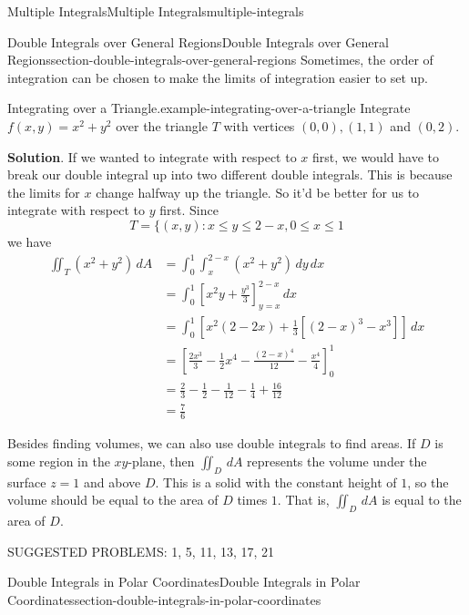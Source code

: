 \documentclass[oneside,10pt,]{book}
\numberwithin{equation}{section}
\begin{document}
\begin{chapterptx}{Multiple Integrals}{}{Multiple Integrals}{}{}{multiple-integrals}
\begin{sectionptx}{Double Integrals over General Regions}{}{Double Integrals over General Regions}{}{}{section-double-integrals-over-general-regions}
\hypertarget{p-1483}{}%
Sometimes, the order of integration can be chosen to make the limits of integration easier to set up.%
\begin{example}{Integrating over a Triangle.}{example-integrating-over-a-triangle}%
\hypertarget{p-1484}{}%
Integrate \(f(x,y) = x^{2} + y^{2}\) over the triangle \(T\) with vertices \((0,0), (1,1)\) and \((0,2)\).%
\par\smallskip%
\noindent\textbf{Solution}.\hypertarget{solution-243}{}\quad%
\hypertarget{p-1485}{}%
If we wanted to integrate with respect to \(x\) first, we would have to break our double integral up into two different double integrals. This is because the limits for \(x\) change halfway up the triangle. So it'd be better for us to integrate with respect to \(y\) first. Since%
\begin{equation*}
T = \{(x,y) : x \leq y \leq 2-x, 0\leq x\leq 1
\end{equation*}
we have%
\begin{align*}
\iint_{T}(x^{2} + y^{2})\,dA & = \int_{0}^{1}\int_{x}^{2-x}(x^{2} + y^{2})\,dy\,dx \\
& = \int_{0}^{1}\left[x^{2}y + \frac{y^{3}}{3}\right]_{y=x}^{2-x}\,dx \\
& = \int_{0}^{1} \left[x^{2}(2-2x) + \frac{1}{3}[(2-x)^{3} - x^{3}]\right]\,dx \\
& = \left[\frac{2x^{3}}{3} - \frac{1}{2}x^{4} - \frac{(2-x)^{4}}{12} - \frac{x^{4}}{4}\right]_{0}^{1} \\
& = \frac{2}{3} - \frac{1}{2} - \frac{1}{12} - \frac{1}{4} + \frac{16}{12} \\
& = \frac{7}{6} 
\end{align*}
%
\end{example}
\hypertarget{p-1486}{}%
Besides finding volumes, we can also use double integrals to find areas. If \(D\) is some region in the \(xy\)-plane, then \(\iint_{D}\,dA\) represents the volume under the surface \(z=1\) and above \(D\). This is a solid with the constant height of \(1\), so the volume should be equal to the area of \(D\) times \(1\). That is, \(\iint_{D}\,dA\) is equal to the area of \(D\).%
\par
\hypertarget{p-1487}{}%
SUGGESTED PROBLEMS: 1, 5, 11, 13, 17, 21%
\end{sectionptx}
%
%
\typeout{************************************************}
\typeout{************************************************}
%
\begin{sectionptx}{Double Integrals in Polar Coordinates}{}{Double Integrals in Polar Coordinates}{}{}{section-double-integrals-in-polar-coordinates}

\end{sectionptx}
\end{chapterptx}
\end{document}
